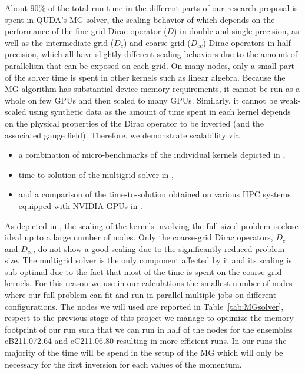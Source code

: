 About 90\% of the total run-time in the different parts of our research proposal is spent in QUDA's MG solver, the scaling behavior of which depends on the performance of the fine-grid Dirac operator ($D$) in double and single precision, as well as the intermediate-grid ($D_c$) and coarse-grid ($D_{cc}$) Dirac operators in half precision, which all have slightly different scaling behaviors due to the amount of parallelism that can be exposed on each grid.
On many nodes, only a small part of the solver time is spent in other kernels such as linear algebra.
Because the MG algorithm has substantial device memory requirements, it cannot be run as a whole on few GPUs and then scaled to many GPUs.
Similarly, it cannot be weak-scaled using synthetic data as the amount of time spent in each kernel depends on the physical properties of the Dirac operator to be inverted (and the associated gauge field).
Therefore, we demonstrate scalability via
\begin{itemize}
	\item  a combination of micro-benchmarks of the individual kernels depicted in ,
	\item time-to-solution of the multigrid solver in ,
	\item and a comparison of the time-to-solution obtained on various HPC systems equipped with NVIDIA GPUs  in .
\end{itemize}
As depicted in , the scaling of the kernels involving the full-sized problem is close ideal up to a large number of nodes.
Only the coarse-grid Dirac operators, $D_c$ and $D_{cc}$, do not show a good scaling due to the significantly reduced problem size.
The multigrid solver is the only component affected by it and its scaling is sub-optimal due to the fact that most of the time is spent on the coarse-grid kernels. For this reason we use in our calculations the smallest number of nodes where our full problem can fit and run in parallel multiple jobs on different configurations.
The nodes we will used are reported in Table~\ref{tab:MGsolver}, respect to the
previous stage of this project we manage to optimize the memory footprint
of our run such that we can run in half of the nodes for the ensembles cB211.072.64
and cC211.06.80 resulting in more efficient runs.
In our runs the majority of the time will be spend in the setup of the MG
which will only be necessary for the first inversion for each values of the momentum.

